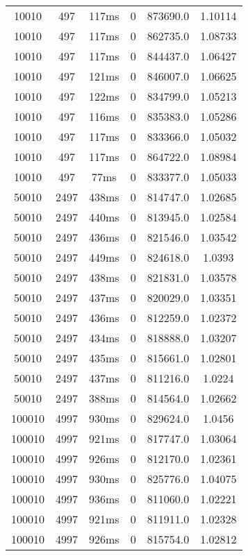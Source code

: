 \documentclass[./main.tex]{subfiles}
\begin{document}
\begin{table}
\begin{tabular}{ c | c | c | c | c | c }
        10010 & 497 & 117ms & 0 & 873690.0 & 1.10114 \\
        10010 & 497 & 117ms & 0 & 862735.0 & 1.08733 \\
        10010 & 497 & 117ms & 0 & 844437.0 & 1.06427 \\
        10010 & 497 & 121ms & 0 & 846007.0 & 1.06625 \\
        10010 & 497 & 122ms & 0 & 834799.0 & 1.05213 \\
        10010 & 497 & 116ms & 0 & 835383.0 & 1.05286 \\
        10010 & 497 & 117ms & 0 & 833366.0 & 1.05032 \\
        10010 & 497 & 117ms & 0 & 864722.0 & 1.08984 \\
        10010 & 497 & 77ms & 0 & 833377.0 & 1.05033 \\
        \hline
        50010 & 2497 & 438ms & 0 & 814747.0 & 1.02685 \\
        50010 & 2497 & 440ms & 0 & 813945.0 & 1.02584 \\
        50010 & 2497 & 436ms & 0 & 821546.0 & 1.03542 \\
        50010 & 2497 & 449ms & 0 & 824618.0 & 1.0393 \\
        50010 & 2497 & 438ms & 0 & 821831.0 & 1.03578 \\
        50010 & 2497 & 437ms & 0 & 820029.0 & 1.03351 \\
        50010 & 2497 & 436ms & 0 & 812259.0 & 1.02372 \\
        50010 & 2497 & 434ms & 0 & 818888.0 & 1.03207 \\
        \rowcolor{lightgray} 50010 & 2497 & 435ms & 0 & 815661.0 & 1.02801 \\
        50010 & 2497 & 437ms & 0 & 811216.0 & 1.0224 \\
        50010 & 2497 & 388ms & 0 & 814564.0 & 1.02662 \\
        \hline
        100010 & 4997 & 930ms & 0 & 829624.0 & 1.0456 \\
        100010 & 4997 & 921ms & 0 & 817747.0 & 1.03064 \\
        100010 & 4997 & 926ms & 0 & 812170.0 & 1.02361 \\
        100010 & 4997 & 930ms & 0 & 825776.0 & 1.04075 \\
        100010 & 4997 & 936ms & 0 & 811060.0 & 1.02221 \\
        100010 & 4997 & 921ms & 0 & 811911.0 & 1.02328 \\
        100010 & 4997 & 926ms & 0 & 815754.0 & 1.02812 \\

\end{tabular}
\end{table}
\end{document}
